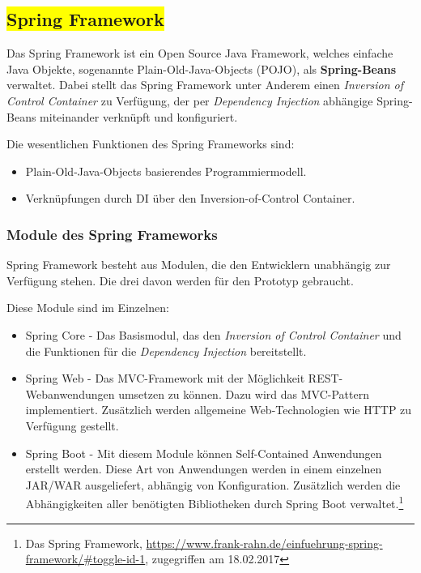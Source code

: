 \subsection{\colorbox{yellow}{Spring Framework}}

Das Spring Framework ist ein Open Source Java Framework, welches einfache Java Objekte, sogenannte Plain-Old-Java-Objects (POJO), als \textbf{Spring-Beans} verwaltet. Dabei stellt das Spring Framework unter Anderem einen \textit{Inversion of Control Container} zu Verfügung, der per \textit{Dependency Injection} abhängige Spring-Beans miteinander verknüpft und konfiguriert.

Die wesentlichen Funktionen des Spring Frameworks sind:
\begin{itemize}
	\item Plain-Old-Java-Objects basierendes Programmiermodell.
	\item Verknüpfungen durch DI über den Inversion-of-Control Container.
\end{itemize}

\subsubsection{Module des Spring Frameworks}

Spring Framework besteht aus Modulen, die den Entwicklern unabhängig zur Verfügung stehen. Die drei davon werden für den Prototyp gebraucht.

Diese Module sind im Einzelnen:

\begin{itemize}
	\item Spring Core - Das Basismodul, das den \textit{Inversion of Control Container} und die Funktionen für die \textit{Dependency Injection} bereitstellt.
	\item Spring Web - Das MVC-Framework mit der Möglichkeit REST-Webanwendungen umsetzen zu können. Dazu wird das MVC-Pattern implementiert. Zusätzlich werden allgemeine Web-Technologien wie HTTP zu Verfügung gestellt.
	\item Spring Boot - Mit diesem Module können Self-Contained Anwendungen erstellt werden. Diese Art von Anwendungen werden in einem einzelnen JAR/WAR ausgeliefert, abhängig von Konfiguration. Zusätzlich werden die Abhängigkeiten aller benötigten Bibliotheken durch Spring Boot verwaltet.\footnote{Das Spring Framework, \url{https://www.frank-rahn.de/einfuehrung-spring-framework/\#toggle-id-1}, zugegriffen am 18.02.2017}
	\end{itemize}

